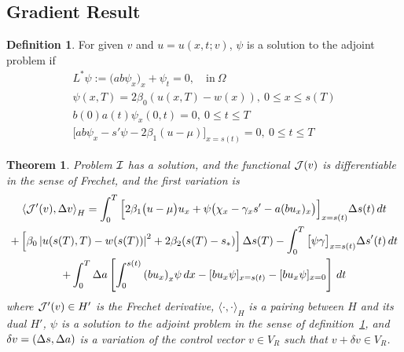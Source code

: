 \documentclass[letterpaper, 10pt]{amsart}
\newtheorem{theorem}{Theorem}
\theoremstyle{definition}
\newtheorem{definition}{Definition}
\theoremstyle{remark}
\newcommand{\lnorm}[1]{\left\vert #1\right\vert}%
\begin{document}
\subsection{Gradient Result}\label{sec:frechet-gradient}

\begin{definition}\label{defn:adjoint}
  For given $v$ and $u = u(x, t; v)$, $\psi$ is a solution to the adjoint problem if
  \begin{gather}
    L^{*} \psi := \big(a b \psi_x\big)_x + \psi_t = 0,\quad\text{in}~\Omega \label{eq:adj-pde}
    \\
    \psi(x, T) = 2\beta_0(u(x, T) - w(x)),~0 \leq x \leq s(T) \label{eq:adj-finalmoment}
    \\
    b(0)a(t)\psi_x(0, t) =0,~0 \leq t \leq T \label{eq:adj-robin-fixed}
    \\
    \Big[a b \psi_x - s'\psi - 2\beta_1(u - \mu)\Big]_{x=s(t)}=0, ~0 \leq t \leq T \label{eq:adj-robin-free}
  \end{gather}
\end{definition}


\begin{theorem}\label{thm:gradient-result}
  Problem $\mathcal{I}$ has a solution, and the functional $\mathcal{J}(v)$ is differentiable in the sense of Frechet, and the first variation is
  \begin{gather}
    \left\langle \J'(v),\Delta v \right\rangle_H
    = \int_0^T \Big[2\beta_1\big(u - \mu\big)u_x + \psi \big(\chi_x - \gamma_x s'  - a (b u_x)_x \big)\Big]_{x=s(t)} {\Delta s}(t)\,dt \nonumber
    \\
    +
    \left[\beta_0\lnorm{u(s(T),T) - w(s(T))}^2 + 2 \beta_2 (s(T) - s_*)\right] {\Delta s}(T) 
    - \int_0^T \big[\psi \gamma\big]_{x=s(t)} {\Delta s}'(t) \,dt \nonumber
    \\
    +\int_0^T {\Delta a} \left[ \int_0^{s(t)} {(b u_x)}_x \psi \,dx - [b u_x\psi]_{x=s(t)} - [b u_x \psi]_{x=0}\right] \,dt\label{eq:gradient-full}
  \end{gather}
  where $\mathcal{J}'(v) \in H'$ is the Frechet derivative, $\langle \cdot,\cdot \rangle_H$ is a pairing between $H$ and its dual $H'$, $\psi$ is a solution to the adjoint problem in the sense of definition~\ref{defn:adjoint}, and $\delta v = ({\Delta s}, {\Delta a}{})$ is a variation of the control vector $v \in V_R$ such that $v + \delta v \in V_R$.
\end{theorem}
\end{document}
